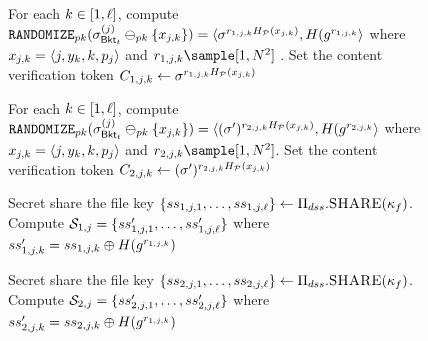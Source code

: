 \begin{figure}
{\begin{minipage}[t]{\textwidth}
\item For each $k \in [1, \ell]$, compute $\randomize[\pubKey](\genericSig[\bucket{\bucketIdx}]^{(\projIdx)} \sigMinus[\pubKey] \{x_{\projIdx, \vecIdx}\}) = \langle  \genericSig^{\genericRand_{1, \projIdx, \vecIdx} \primeRO(x_{\projIdx, \vecIdx})}, \ro(\qrGen^{\genericRand_{1, \projIdx, \vecIdx}} \rangle $ where $x_{\projIdx, \vecIdx} = \langle \projIdx, \clientVec[\vecIdx], \vecIdx, \clientVecProj[\projIdx] \rangle$ and $\genericRand_{1, \projIdx, \vecIdx} \sample [1, \rsaMod^2]$ . Set the content verification token $\contentToken{1, \projIdx, \vecIdx} \assign \genericSig^{\genericRand_{1, \projIdx, \vecIdx} \primeRO(x_{\projIdx, \vecIdx})}$



\item For each $k \in [1, \ell]$, compute $\randomize[\pubKey](\genericSig[\bucket{\bucketIdx}]^{(\projIdx)} \sigMinus[\pubKey] \{x_{\projIdx, \vecIdx}\}) = \langle  (\genericSig')^{\genericRand_{2, \projIdx, \vecIdx} \primeRO(x_{\projIdx, \vecIdx})}, \ro(\qrGen^{\genericRand_{2, \projIdx, \vecIdx}} \rangle $ where $x_{\projIdx, \vecIdx} = \langle \projIdx, \clientVec[\vecIdx], \vecIdx, \clientVecProj[\projIdx] \rangle$ and $\genericRand_{2, \projIdx, \vecIdx} \sample [1, \rsaMod^2]$. Set the content verification token $\contentToken{2, \projIdx, \vecIdx} \assign (\genericSig')^{\genericRand_{2, \projIdx, \vecIdx} \primeRO(x_{\projIdx, \vecIdx})}$

\item Secret share the file key $\{ ss_{1, j, 1}, \dots, ss_{1, j, \ell} \} \gets \Pi_{dss}.\textsc{SHARE}(\kappa_{f})$. Compute $\genericSetVar[1, \projIdx] = \{ \secretShare{1, \projIdx, 1}', \dots, \secretShare{1, \projIdx, \genericVecLen}' \} $ where $\secretShare{1, \projIdx, \vecIdx}' = \secretShare{1, \projIdx, \vecIdx} \oplus \ro(\qrGen^{\genericRand_{1, \projIdx, \vecIdx}})$ 


\item Secret share the file key $\{ ss_{2, j, 1}, \dots, ss_{2, j, \ell} \} \gets \Pi_{dss}.\textsc{SHARE}(\kappa_{f})$. Compute $\genericSetVar[2, \projIdx] = \{ \secretShare{2, \projIdx, 1}', \dots, \secretShare{2, \projIdx, \genericVecLen}' \} $ where $\secretShare{2, \projIdx, \vecIdx}' = \secretShare{2, \projIdx, \vecIdx} \oplus \ro(\qrGen^{\genericRand_{1, \projIdx, \vecIdx}})$ 




\end{minipage}}
\end{figure}
